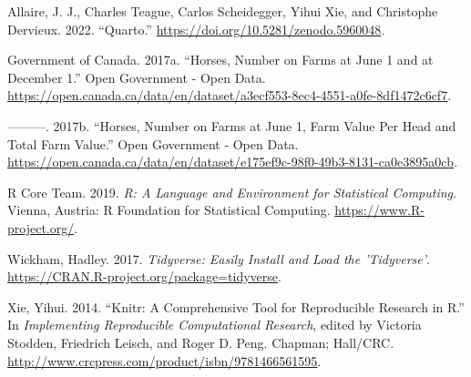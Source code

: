 \documentclass[
  letterpaper,
  DIV=11,
  numbers=noendperiod]{scrartcl}
\newlength{\cslhangindent}
\newenvironment{CSLReferences}[2] %
 {\begin{list}{}{%
  \setlength{\itemindent}{0pt}
  \setlength{\leftmargin}{0pt}
  \setlength{\parsep}{0pt}
  \ifodd #1
   \setlength{\leftmargin}{\cslhangindent}
   \setlength{\itemindent}{-1\cslhangindent}
  \fi
  \setlength{\itemsep}{#2\baselineskip}}}
 {\end{list}}
\begin{document}
\label{refs}
\begin{CSLReferences}{1}{0}
Allaire, J. J., Charles Teague, Carlos Scheidegger, Yihui Xie, and
Christophe Dervieux. 2022. {``{Quarto}.''}
\url{https://doi.org/10.5281/zenodo.5960048}.

Government of Canada. 2017a. {``Horses, Number on Farms at June 1 and at
December 1.''} Open Government - Open Data.
\url{https://open.canada.ca/data/en/dataset/a3ecf553-8ec4-4551-a0fe-8df1472c6cf7}.

---------. 2017b. {``Horses, Number on Farms at June 1, Farm Value Per
Head and Total Farm Value.''} Open Government - Open Data.
\url{https://open.canada.ca/data/en/dataset/e175ef9c-98f0-49b3-8131-ca0e3895a0cb}.

R Core Team. 2019. \emph{R: A Language and Environment for Statistical
Computing}. Vienna, Austria: R Foundation for Statistical Computing.
\url{https://www.R-project.org/}.

Wickham, Hadley. 2017. \emph{Tidyverse: Easily Install and Load the
'Tidyverse'}. \url{https://CRAN.R-project.org/package=tidyverse}.

Xie, Yihui. 2014. {``Knitr: A Comprehensive Tool for Reproducible
Research in {R}.''} In \emph{Implementing Reproducible Computational
Research}, edited by Victoria Stodden, Friedrich Leisch, and Roger D.
Peng. Chapman; Hall/CRC.
\url{http://www.crcpress.com/product/isbn/9781466561595}.

\end{CSLReferences}
\end{document}
